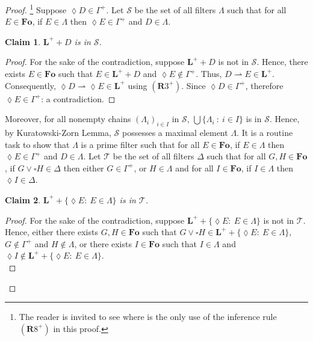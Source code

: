 \documentclass[10pt,a4paper]{amsart}
\newtheorem{claim}{Claim}
\def\Fo{\mathbf{Fo}}
\def\L{\mathbf{L}}
\def\Rule{\mathbf{R}}
\begin{document}
\begin{proof}\footnote{The reader is invited to see where is the only use of the inference rule $(\Rule8^{+})$ in this proof.}
%
%
Suppose ${\lozenge}D{\in}\Gamma^{+}$.
Let ${\mathcal S}$ be the set of all filters $\Lambda$ such that for all $E{\in}\Fo$, if $E{\in}\Lambda$ then ${\lozenge}E{\in}\Gamma^{+}$ and $D{\in}\Lambda$.
%
%
\begin{claim}
%
%
$\L^{+}{+}D$ is in ${\mathcal S}$.
%
%
\end{claim}
%
%
\begin{proof}
%
%
For the sake of the contradiction, suppose $\L^{+}{+}D$ is not in ${\mathcal S}$.
Hence, there exists $E{\in}\Fo$ such that $E{\in}\L^{+}{+}D$ and ${\lozenge}E{\not\in}\Gamma^{+}$.
Thus, $D{\rightharpoonup}E{\in}\L^{+}$.
Consequently, ${\lozenge}D{\rightharpoonup}{\lozenge}E{\in}\L^{+}$ using $(\Rule3^{+})$.
Since ${\lozenge}D{\in}\Gamma^{+}$, therefore ${\lozenge}E{\in}\Gamma^{+}$: a contradiction.
%
%
\medskip
%
%
\end{proof}
%
%
Moreover, for all nonempty chains $(\Lambda_{i})_{i{\in}I}$ in ${\mathcal S}$, $\bigcup\{\Lambda_{i}\ :\ i{\in}I\}$ is in ${\mathcal S}$.
Hence, by Kuratowski-Zorn Lemma, ${\mathcal S}$ possesses a maximal element $\Lambda$.
It is a routine task to show that $\Lambda$ is a prime filter such that for all $E{\in}\Fo$, if $E{\in}\Lambda$ then ${\lozenge}E{\in}\Gamma^{+}$ and $D{\in}\Lambda$.
Let ${\mathcal T}$ be the set of all filters $\Delta$ such that for all $G,H{\in}\Fo$, if $G{\vee}{\square}H{\in}\Delta$ then either $G{\in}\Gamma^{+}$, or $H{\in}\Lambda$ and for all $I{\in}\Fo$, if $I{\in}\Lambda$ then ${\lozenge}I{\in}\Delta$.
%
%
\begin{claim}
%
%
$\L^{+}{+}\{{\lozenge}E:\ E{\in}\Lambda\}$ is in ${\mathcal T}$.
%
%
\end{claim}
%
%
\begin{proof}
%
%
For the sake of the contradiction, suppose $\L^{+}{+}\{{\lozenge}E:\ E{\in}\Lambda\}$ is not in ${\mathcal T}$.
Hence, either there exists $G,H{\in}\Fo$ such that $G{\vee}{\square}H{\in}\L^{+}{+}\{{\lozenge}E:\ E{\in}\Lambda\}$, $G{\not\in}\Gamma^{+}$ and $H{\not\in}\Lambda$, or there exists $I{\in}\Fo$ such that $I{\in}\Lambda$ and ${\lozenge}I{\not\in}\L^{+}{+}\{{\lozenge}E:\ E{\in}\Lambda\}$.
%
%
\\

\end{proof}
\end{proof}
\end{document}
